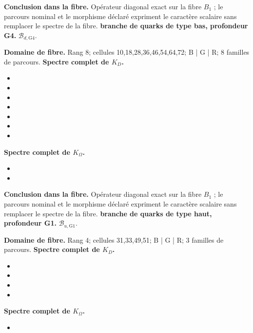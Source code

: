 \noindent\textbf{Conclusion dans la fibre.} Opérateur diagonal exact sur la fibre \(B_1\) ; le parcours nominal et le morphisme déclaré expriment le caractère scalaire sans remplacer le spectre de la fibre.
\medskip
{}
\noindent\textbf{branche de quarks de type bas, profondeur G4.} \(\mathcal B_{d,\mathrm{G4}}\).\par
\noindent\textbf{Domaine de fibre.} Rang 8; cellules 10,18,28,36,46,54,64,72; B | G | R; 8 familles de parcours.
\noindent\textbf{Spectre complet de \(K_D\).}
\begin{itemize}
\item \texttt{}
\item \texttt{}
\item \texttt{}
\item \texttt{}
\item \texttt{}
\item \texttt{}
\item \texttt{}
\end{itemize}
\noindent\textbf{Spectre complet de \(K_\Omega\).}
\begin{itemize}
\item \texttt{}
\item \texttt{}
\end{itemize}
\noindent\textbf{Conclusion dans la fibre.} Opérateur diagonal exact sur la fibre \(B_1\) ; le parcours nominal et le morphisme déclaré expriment le caractère scalaire sans remplacer le spectre de la fibre.
\medskip
{}
\noindent\textbf{branche de quarks de type haut, profondeur G1.} \(\mathcal B_{u,\mathrm{G1}}\).\par
\noindent\textbf{Domaine de fibre.} Rang 4; cellules 31,33,49,51; B | G | R; 3 familles de parcours.
\noindent\textbf{Spectre complet de \(K_D\).}
\begin{itemize}
\item \texttt{}
\item \texttt{}
\item \texttt{}
\item \texttt{}
\end{itemize}
\noindent\textbf{Spectre complet de \(K_\Omega\).}
\begin{itemize}
\item \texttt{}
\end{itemize}
